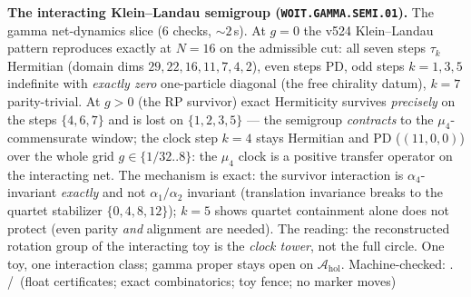 
\par\smallskip\noindent\textbf{The interacting Klein--Landau
semigroup (\texttt{WOIT.GAMMA.SEMI.01}).}
The gamma net-dynamics slice ($6$ checks, ${\sim}2$\,s).  At $g=0$
the v524 Klein--Landau pattern reproduces exactly at $N=16$ on the
admissible cut: all seven steps $\tau_k$ Hermitian (domain dims
$29,22,16,11,7,4,2$), even steps PD, odd steps $k=1,3,5$ indefinite
with \emph{exactly zero} one-particle diagonal (the free chirality
datum), $k=7$ parity-trivial.  At $g>0$ (the RP survivor) exact
Hermiticity survives \emph{precisely} on the steps $\{4,6,7\}$ and
is lost on $\{1,2,3,5\}$ --- the semigroup \emph{contracts} to the
$\mu_4$-commensurate window; the clock step $k=4$ stays Hermitian
and PD ($(11,0,0)$) over the whole grid $g\in\{1/32..8\}$: the
$\mu_4$ clock is a positive transfer operator on the interacting
net.  The mechanism is exact: the survivor interaction is
$\alpha_4$-invariant \emph{exactly} and not $\alpha_1/\alpha_2$
invariant (translation invariance breaks to the quartet stabilizer
$\{0,4,8,12\}$); $k=5$ shows quartet containment alone does not
protect (even parity \emph{and} alignment are needed).  The reading:
the reconstructed rotation group of the interacting toy is the
\emph{clock tower}, not the full circle.  One toy, one interaction
class; gamma proper stays open on $\mathcal A_{\mathrm{hol}}$.
Machine-checked: .
\mE/\mC\ (float certificates; exact combinatorics; toy fence;
no marker moves)
\par\smallskip

